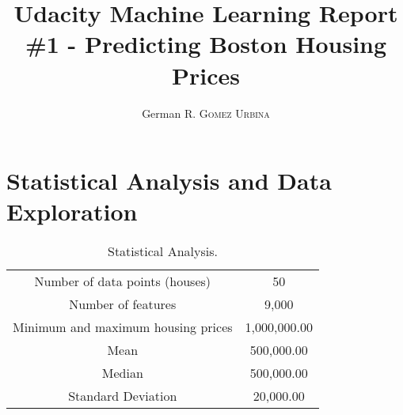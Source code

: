 \documentclass{article}
\title{Udacity Machine Learning Report \#1 - Predicting Boston Housing Prices} %
\author{German R. \textsc{Gomez Urbina}} %
\begin{document}

\maketitle

\newpage


\section{Statistical Analysis and Data Exploration}

\begin{table}[h!]
\centering
\caption{Statistical Analysis.}
\label{tab:table1}
\begin{tabular}{cc}

\toprule

\midrule
Number of data points (houses) & 50\\
Number of features & 9,000\\
Minimum and maximum housing prices & 1,000,000.00\\
Mean & 500,000.00\\
Median & 500,000.00\\
Standard Deviation & 20,000.00\\

\bottomrule

\end{tabular}
\end{table}
\end{document}

